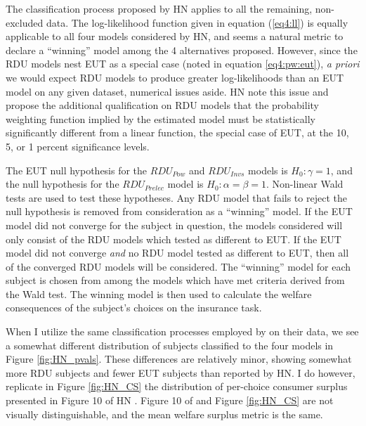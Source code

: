 \documentclass[../main.tex]{subfiles}
\begin{document}


The classification process proposed by HN applies to all the remaining, non-excluded data.
The log-likelihood function given in equation (\ref{eq4:ll}) is equally applicable to all four models considered by HN, and seems a natural metric to declare a \enquote{winning} model among the 4 alternatives proposed.
However, since the RDU models nest EUT as a special case (noted in equation \ref{eq4:pw:eut}), \textit{a priori} we would expect RDU models to produce greater log-likelihoods than an EUT model on any given dataset, numerical issues aside.
HN \parencite*[102]{Harrison2016} note this issue and propose the additional qualification on RDU models that the probability weighting function implied by the estimated model must be statistically significantly different from a linear function, the special case of EUT, at the 10, 5, or 1 percent significance levels.

The EUT null hypothesis for the $\mathit{RDU_{Pow}}$ and $\mathit{RDU_{Invs}}$ models is $H_0: \gamma = 1$, and the null hypothesis for the $\mathit{RDU_{Prelec}}$ model is $H_0: \alpha = \beta = 1$.
Non-linear Wald tests are used to test these hypotheses.
Any RDU model that fails to reject the null hypothesis is removed from consideration as a \enquote{winning} model.
If the EUT model did not converge for the subject in question, the models considered will only consist of the RDU models which tested as different to EUT.
If the EUT model did not converge \textit{and} no RDU model tested as different to EUT, then all of the converged RDU models will be considered.
The \enquote{winning} model for each subject is chosen from among the models which have met criteria derived from the Wald test.
The winning model is then used to calculate the welfare consequences of the subject's choices on the insurance task.

When I utilize the same classification processes employed by \textcite{Harrison2016} on their data, we see a somewhat different distribution of subjects classified to the four models in Figure \ref{fig:HN_pvals}.
These differences are relatively minor, showing somewhat more RDU subjects and fewer EUT subjects than reported by HN.
I do however, replicate in Figure \ref{fig:HN_CS} the distribution of per-choice consumer surplus presented in Figure 10 of HN \parencite[108]{Harrison2016}.
Figure 10 of \textcite{Harrison2016} and Figure \ref{fig:HN_CS} are not visually distinguishable, and the mean welfare surplus metric is the same.
\end{document}

